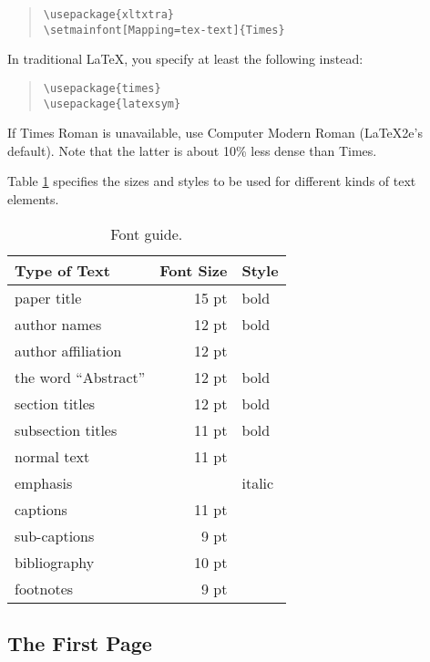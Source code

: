 \documentclass{clarin}
\begin{document}
\begin{quote}
\begin{verbatim}
\usepackage{xltxtra}
\setmainfont[Mapping=tex-text]{Times}
\end{verbatim}
\end{quote}

In traditional LaTeX, you specify at least the following instead:

\begin{quote}
\begin{verbatim}
\usepackage{times}
\usepackage{latexsym}
\end{verbatim}
\end{quote}
 If Times Roman is unavailable, use Computer
 Modern Roman (LaTeX2e's default).  Note that the latter is about
 10\% less dense than Times.

Table \ref{font-table} specifies the sizes and styles to be used for
different kinds of text elements.

\begin{table}[htb]
\begin{center}
\begin{tabular}{|l|rl|}
\hline \bf Type of Text & \bf Font Size & \bf Style \\ \hline
paper title & 15 pt & bold \\
author names & 12 pt & bold \\
author affiliation & 12 pt & \\
the word ``Abstract'' & 12 pt & bold \\
section titles & 12 pt & bold \\
subsection titles & 11 pt & bold\\
normal text & 11 pt  &\\
emphasis & & italic\\
captions & 11 pt & \\
sub-captions & 9 pt & \\
bibliography & 10 pt & \\
footnotes & 9 pt & \\
\hline
\end{tabular}
\end{center}
\caption{\label{font-table} Font guide. }
\end{table}

\subsection{The First Page}
\label{ssec:first}
\end{document}
